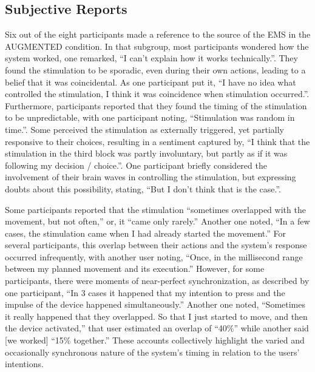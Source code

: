 \subsection{Subjective Reports}
Six out of the eight participants made a reference to the source of the EMS in the AUGMENTED condition. In that subgroup, most participants wondered how the system worked, one remarked, ``I can't explain how it works technically.''. They found the stimulation to be sporadic, even during their own actions, leading to a belief that it was coincidental. As one participant put it, ``I have no idea what controlled the stimulation, I think it was coincidence when stimulation occurred.''. Furthermore, participants reported that they found the timing of the stimulation to be unpredictable, with one participant noting, ``Stimulation was random in time.''. Some perceived the stimulation as externally triggered, yet partially responsive to their choices, resulting in a sentiment captured by, ``I think that the stimulation in the third block was partly involuntary, but partly as if it was following my decision / choice.''. One participant briefly considered the involvement of their brain waves in controlling the stimulation, but expressing doubts about this possibility, stating, ``But I don't think that is the case.''.

Some participants reported that the stimulation ``sometimes overlapped with the movement, but not often,'' or, it ``came only rarely.'' Another one noted, ``In a few cases, the stimulation came when I had already started the movement.'' For several participants, this overlap between their actions and the system's response occurred infrequently, with another user noting, ``Once, in the millisecond range between my planned movement and its execution.'' However, for some participants, there were moments of near-perfect synchronization, as described by one participant, ``In 3 cases it happened that my intention to press and the impulse of the device happened simultaneously.'' Another one noted, ``Sometimes it really happened that they overlapped. So that I just started to move, and then the device activated,'' that user estimated an overlap of ``40\%'' while another said [we worked] ``15\% together.'' These accounts collectively highlight the varied and occasionally synchronous nature of the system's timing in relation to the users' intentions.

